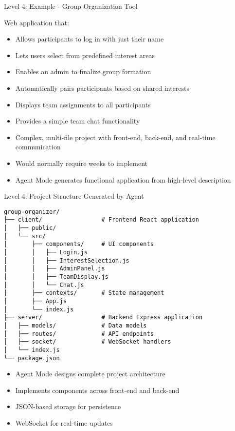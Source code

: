 \documentclass{beamer}
\begin{document}
\begin{frame}{Level 4: Example - Group Organization Tool}
    \begin{tcolorbox}[colback=mypurple!5,colframe=mypurple,title=Project Requirements]
        Web application that:
        \begin{itemize}
            \item Allows participants to log in with just their name
            \item Lets users select from predefined interest areas
            \item Enables an admin to finalize group formation
            \item Automatically pairs participants based on shared interests
            \item Displays team assignments to all participants
            \item Provides a simple team chat functionality
        \end{itemize}
    \end{tcolorbox}
    
    \begin{itemize}
        \item Complex, multi-file project with front-end, back-end, and real-time communication
        \item Would normally require weeks to implement
        \item Agent Mode generates functional application from high-level description
    \end{itemize}
\end{frame}

\begin{frame}[fragile]{Level 4: Project Structure Generated by Agent}
    \begin{lstlisting}[basicstyle=\tiny\ttfamily]
group-organizer/
├── client/                 # Frontend React application
│   ├── public/
│   └── src/
│       ├── components/     # UI components
│       │   ├── Login.js
│       │   ├── InterestSelection.js
│       │   ├── AdminPanel.js
│       │   ├── TeamDisplay.js
│       │   └── Chat.js
│       ├── contexts/       # State management
│       ├── App.js
│       └── index.js
├── server/                 # Backend Express application
│   ├── models/             # Data models
│   ├── routes/             # API endpoints
│   ├── socket/             # WebSocket handlers
│   └── index.js
└── package.json
    \end{lstlisting}
    
    \begin{itemize}
        \item Agent Mode designs complete project architecture
        \item Implements components across front-end and back-end
        \item JSON-based storage for persistence
        \item WebSocket for real-time updates
    \end{itemize}
\end{frame}
\end{document}
